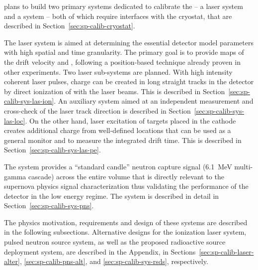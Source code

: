  plans to build two primary systems dedicated to %
calibrate the  -- a laser system
and a  system -- both of which require interfaces with the cryostat, that are described in Section~\ref{sec:sp-calib-cryostat}. 

The laser system is aimed at %
determining the essential detector model parameters with high spatial and time granularity. The primary goal is to provide maps of the drift velocity and \efield, following a position-based technique already proven in other  experiments. %
Two laser sub-systems are planned. 
With high intensity coherent laser pulses, charge can be created in long straight tracks in the detector by direct ionization of  with the laser beams. This is described in Section~\ref{sec:sp-calib-sys-las-ion}. An auxiliary system aimed at an independent measurement and cross-check of the laser track direction is described in Section~\ref{sec:sp-calib-sys-las-loc}.
On the other hand, laser excitation of targets placed in the cathode creates additional charge from well-defined locations that can be used %
as a general  monitor and to measure the integrated drift time. This is described in Section~\ref{sec:sp-calib-sys-las-pe}. 

The  system %
provides a ``standard candle'' neutron capture signal (\SI{6.1}{\MeV} multi-gamma cascade) across the entire  volume that is directly relevant to the supernova physics signal characterization thus validating the performance of the detector in the low energy regime. The  system is described in detail in Section~\ref{sec:sp-calib-sys-pns}.  

The physics motivation, requirements and design of these systems are described in the following subsections. Alternative designs
for the ionization laser system, pulsed neutron source system, as well as the proposed radioactive source deployment system, are described in the Appendix, in Sections~\ref{sec:sp-calib-laser-alter}, \ref{sec:sp-calib-pns-alt}, and \ref{sec:sp-calib-sys-rsds}, respectively.